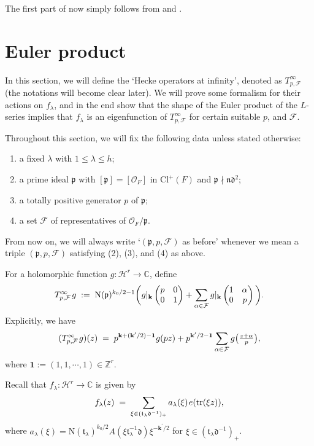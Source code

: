 \documentclass[11pt]{amsart}
\theoremstyle{remark}
\newcommand\m[1]{\begin{pmatrix}#1\end{pmatrix}}
\newcommand\mbf[1]{\mathbf{#1}}
\newcommand\cl[1]{\mathcal{#1}}
\newcommand\fr[1]{\mathfrak{#1}}
\newcommand{\inte}{\mathbb{Z}}
\newcommand{\comp}{\mathbb{C}}
\newcommand{\clh}{\mathcal{H}}
\newcommand{\clo}{\mathcal{O}}
\newcommand{\eq}{\;=\;}
\newcommand{\deq}{\;:=\;}
\newcommand{\bone}{\mathbf{1}}
\def\thin{{\hskip 1pt}}
\newcommand{\N}{\mathrm{N}}
\newcommand{\tr}{\mathrm{tr}}
\newcommand{\Cl}{\mathrm{Cl}}
\begin{document}
The first part of  now simply follows from  and . 

\section{Euler product}
\label{eulerprodsection}
In this section, we will define the `Hecke operators at infinity', denoted as $T_{p,\cl{F}}^\infty$ (the notations will become clear later). We will prove some formalism for their actions on $f_\lambda$, and in the end show that the shape of the Euler product of the $L$-series implies that $f_\lambda$ is an eigenfunction of $T_{p,\cl{F}}^\infty$ for certain suitable $p$, and $\cl{F}$.

Throughout this section, we will fix the following data unless stated otherwise:
\begin{enumerate}[label=(\arabic*)]
    \item a fixed $\lambda$ with $1\leq \lambda\leq h$;
    \item a prime ideal $\fr{p}$ with $[\fr{p}]=[\clo_F]$ in $\Cl^+(F)$ and $\fr{p}\nmid\fr{n}\fr{d}^2$;
    \item a totally positive generator $p$ of $\fr{p}$;
    \item a set $\cl{F}$ of representatives of $\clo_F/\fr{p}$.
\end{enumerate}
From now on, we will always write `$(\fr{p},p,\cl{F})$ as before' whenever we mean a triple $(\fr{p},p,\cl{F})$ satisfying (2), (3), and (4) as above.

For a holomorphic function $g:\clh^r\rightarrow\comp$, define
\begin{align*}
    T_{p,\cl{F}}^\infty\thin g\deq \N(\fr{p})^{k_0/2-1}\bigg(g|_\mbf{k}\m{p&0\\0&1}+\sum_{\alpha\in\cl{F}}g|_\mbf{k}\m{1&\alpha\\0&p}\bigg).
\end{align*}
Explicitly, we have
\begin{align}
\label{explicithecke}
    (T_{p,\cl{F}}^\infty \thin g)(z)\eq p^{\mbf{k}+(\mbf{k}^\prime/2)-\bone}g(pz)+p^{\mbf{k}^\prime/2-\bone}\sum_{\alpha\in\cl{F}}g\big(\tfrac{z+\alpha}{p}\big),
\end{align}
where $\bone:=(1,1,\cdots,1)\in\inte^r$. 

Recall that $f_\lambda:\clh^r\rightarrow\comp$ is given by
\begin{align*}
    f_\lambda(z)\eq\sum_{\xi\in(\fr{t}_\lambda\fr{d}^{-1})_+}a_\lambda(\xi)\thin e(\tr(\xi z)),
\end{align*}
where $a_\lambda(\xi)=\N(\fr{t}_\lambda)^{k_0/2}A(\xi\fr{t}_\lambda^{-1}\fr{d})\xi^{-\mbf{k}^\prime/2}$ for $\xi\in(\fr{t}_\lambda\fr{d}^{-1})_+$.
\end{document}
